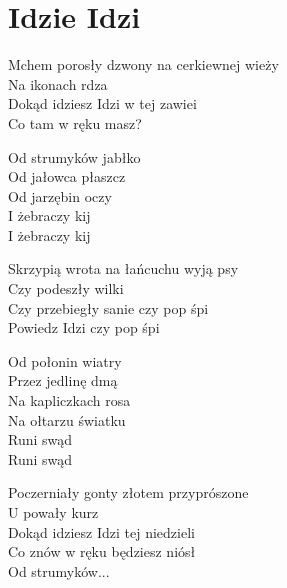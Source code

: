 \section{Idzie Idzi}
\begin{text}
Mchem porosły dzwony na cerkiewnej wieży\\
Na ikonach rdza\\
Dokąd idziesz Idzi w tej zawiei\\
Co tam w ręku masz?

\vin Od strumyków jabłko\\
\vin Od jałowca płaszcz\\
\vin Od jarzębin oczy\\
\vin I żebraczy kij\\
\vin I żebraczy kij

Skrzypią wrota na łańcuchu wyją psy\\
Czy podeszły wilki\\
Czy przebiegły sanie czy pop śpi\\
Powiedz Idzi czy pop śpi

\vin Od połonin wiatry\\
\vin Przez jedlinę dmą\\
\vin Na kapliczkach rosa\\
\vin Na ołtarzu światku\\
\vin Runi swąd\\
\vin Runi swąd

Poczerniały gonty złotem przyprószone\\
U powały kurz\\
Dokąd idziesz Idzi tej niedzieli\\
Co znów w ręku będziesz niósł\\

\vin Od strumyków...
\end{text}